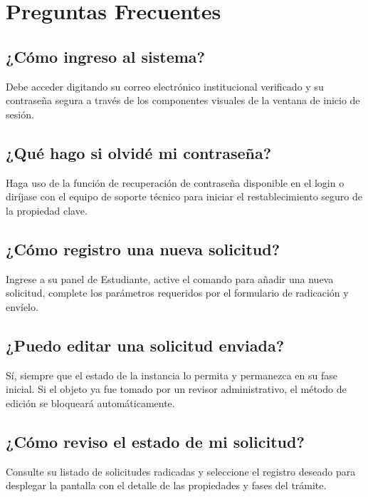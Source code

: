 \documentclass[12pt,letterpaper]{article}
\begin{document}
\section{Preguntas Frecuentes}

\subsection*{¿Cómo ingreso al sistema?}
Debe acceder digitando su correo electrónico institucional verificado y su contraseña segura a través de los componentes visuales de la ventana de inicio de sesión.

\subsection*{¿Qué hago si olvidé mi contraseña?}
Haga uso de la función de recuperación de contraseña disponible en el login o diríjase con el equipo de soporte técnico para iniciar el restablecimiento seguro de la propiedad clave.

\subsection*{¿Cómo registro una nueva solicitud?}
Ingrese a su panel de Estudiante, active el comando para añadir una nueva solicitud, complete los parámetros requeridos por el formulario de radicación y envíelo.

\subsection*{¿Puedo editar una solicitud enviada?}
Sí, siempre que el estado de la instancia lo permita y permanezca en su fase inicial. Si el objeto ya fue tomado por un revisor administrativo, el método de edición se bloqueará automáticamente.

\subsection*{¿Cómo reviso el estado de mi solicitud?}
Consulte su listado de solicitudes radicadas y seleccione el registro deseado para desplegar la pantalla con el detalle de las propiedades y fases del trámite.
\end{document}
